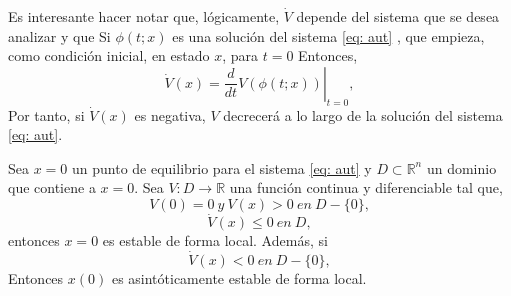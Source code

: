 Es interesante hacer notar que, lógicamente, $\dot V$ depende del sistema que se desea analizar y que Si $\phi(t;x)$ es una solución del sistema \ref{eq: aut} , que empieza, como condición inicial, en estado $x$, para $t=0$ Entonces,
\begin{equation}
\dot V(x) =\left. \frac{d}{dt}V(\phi (t;x))\right|_{t=0},
\end{equation}
Por tanto, si $\dot V(x)$ es negativa, $V$ decrecerá a lo largo de la solución del sistema \ref{eq: aut}.

\begin{theorem}\label{thm: lyap1}
Sea $x=0$ un punto de equilibrio para el sistema \ref{eq: aut} y $D \subset \mathbb{R}^n$ un dominio que contiene a $x=0$. Sea $V:D 	\to \mathbb{R}$ una función continua y diferenciable tal que,
\begin{equation}\label{eq: lyap1}
V(0) = 0\ y\ V(x) > 0\ en\  D-\{0\},
\end{equation}
\begin{equation}\label{eq: lyap2}
\dot V(x) \leq 0\ en\ D,
\end{equation} 
entonces $x=0$ es estable de forma local. Además, si
\begin{equation}\label{eq: lyap3}
\dot V(x) < 0 \ en\ D-\{0\},
\end{equation} 
Entonces $x(0)$ es asintóticamente estable de forma local.
\end{theorem}
